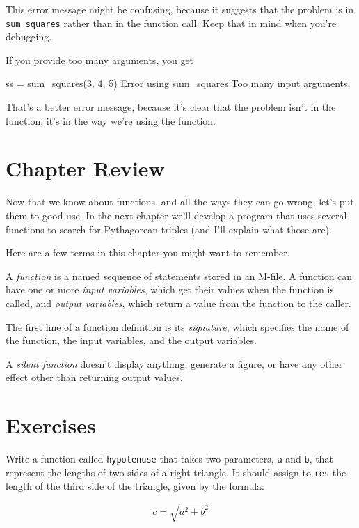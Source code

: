 This error message might be confusing, because it suggests that
the problem is in \verb"sum_squares" rather than in the function call.
Keep that in mind when you're debugging.

If you provide too many arguments, you get

\begin{code}
ss = sum_squares(3, 4, 5)
Error using sum_squares
Too many input arguments.
\end{code}

That's a better error message, because it's clear that the problem isn't in the function; it's in the way we're using the function.

\section{Chapter Review}

Now that we know about functions, and all the ways they can go wrong, let's put them to good use.  In the next chapter we'll develop a program that uses several functions to search for Pythagorean triples (and I'll explain what those are).

Here are a few terms in this chapter you might want to remember.

A {\em function} is a named sequence of statements stored in an M-file.
A function can have one or more {\em input variables}, which get their values when the function is called, and {\em output variables}, which return a value from the function to the caller.

The first line of a function definition is its {\em signature}, which
specifies the name of the function, the input variables, and the
output variables.

A {\em silent function} doesn't display anything, generate a figure, or have any other effect other than returning output values.


\section{Exercises}

\begin{ex}
\label{hypotenuse_exercise}
Write a function called {\tt hypotenuse} that takes two parameters, {\tt a} and {\tt b}, that represent the lengths of two sides of a right triangle.  It should assign to {\tt res} the length of the third side of the triangle, given by the formula:

\[ c = \sqrt{a^2 + b^2} \]
\end{ex}
